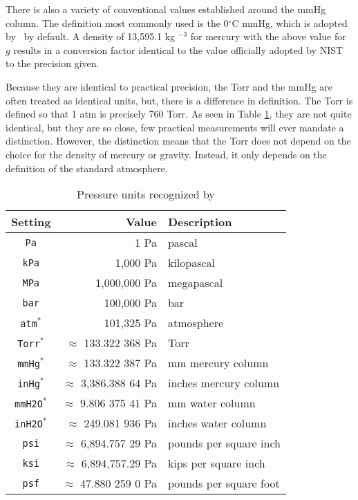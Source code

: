 There is also a variety of conventional values established around the mmHg column.  The definition most commonly used is the 0$^\circ$C mmHg, which is adopted by \PM\ by default.  A density of 13,595.1 kg $^{-3}$ for mercury with the above value for $g$ results in a conversion factor identical to the value officially adopted by NIST \cite[p.52]{nist:sp811} to the precision given.

Because they are identical to practical precision, the Torr and the mmHg are often treated as identical units, but, there is a difference in definition.  The Torr is defined so that 1 atm is precisely 760 Torr.  As seen in Table \ref{tab:pressure}, they are not quite identical, but they are so close, few practical measurements will ever mandate a distinction.  However, the distinction means that the Torr does not depend on the choice for the density of mercury or gravity.  Instead, it only depends on the definition of the standard atmosphere.

\begin{table}
\centering
\caption{Pressure units recognized by \PM}\label{tab:pressure}
\begin{tabular}{crl}
\hline
Setting & Value & Description\\
\hline
\verb|Pa| & 1 Pa & pascal\\
\verb|kPa| & 1,000 Pa & kilopascal\\
\verb|MPa| & 1,000,000 Pa & megapascal\\
\verb|bar| & 100,000 Pa & bar\\
\verb|atm|$^*$ & 101,325 Pa & atmosphere\\
\verb|Torr|$^*$ & $\approx$ 133.322 368 Pa & Torr\\
\verb|mmHg|$^*$ & $\approx$ 133.322 387 Pa & mm mercury column\\
\verb|inHg|$^*$ & $\approx$ 3,386.388 64 Pa & inches mercury column\\
\verb|mmH2O|$^*$ & $\approx$ 9.806 375 41 Pa & mm water column\\
\verb|inH2O|$^*$ & $\approx$ 249.081 936 Pa & inches water column\\
\verb|psi| & $\approx$ 6,894.757 29 Pa & pounds per square inch\\
\verb|ksi| & $\approx$ 6,894,757.29 Pa & kips per square inch\\
\verb|psf| & $\approx$ 47.880 259 0 Pa & pounds per square foot\\
\hline
\end{tabular}
\end{table}

